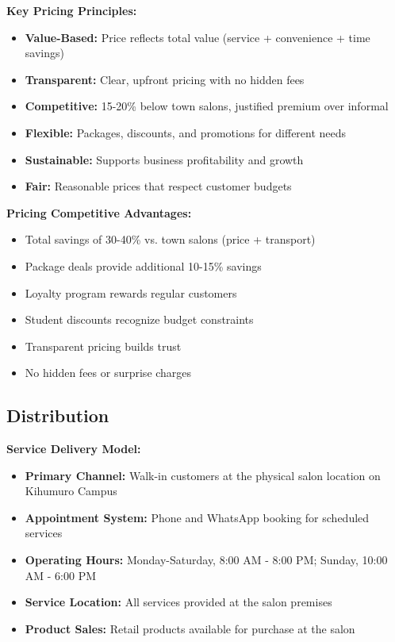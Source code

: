 \documentclass[a4paper,12pt]{article}
\begin{document}
\vspace{1em}

\begin{tcolorbox}[mybox, title=\textbf{Pricing Strategy Success Factors}]
\textbf{Key Pricing Principles:}
\begin{itemize}[leftmargin=1em, itemsep=0pt]
    \item \textbf{Value-Based:} Price reflects total value (service + convenience + time savings)
    \item \textbf{Transparent:} Clear, upfront pricing with no hidden fees
    \item \textbf{Competitive:} 15-20\% below town salons, justified premium over informal
    \item \textbf{Flexible:} Packages, discounts, and promotions for different needs
    \item \textbf{Sustainable:} Supports business profitability and growth
    \item \textbf{Fair:} Reasonable prices that respect customer budgets
\end{itemize}

\textbf{Pricing Competitive Advantages:}
\begin{itemize}[leftmargin=1em, itemsep=0pt]
    \item Total savings of 30-40\% vs. town salons (price + transport)
    \item Package deals provide additional 10-15\% savings
    \item Loyalty program rewards regular customers
    \item Student discounts recognize budget constraints
    \item Transparent pricing builds trust
    \item No hidden fees or surprise charges
\end{itemize}
\end{tcolorbox}

\subsection{Distribution}

\textbf{Service Delivery Model:}
\begin{itemize}[leftmargin=2em]
    \item \textbf{Primary Channel:} Walk-in customers at the physical salon location on Kihumuro Campus
    \item \textbf{Appointment System:} Phone and WhatsApp booking for scheduled services
    \item \textbf{Operating Hours:} Monday-Saturday, 8:00 AM - 8:00 PM; Sunday, 10:00 AM - 6:00 PM
    \item \textbf{Service Location:} All services provided at the salon premises
    \item \textbf{Product Sales:} Retail products available for purchase at the salon
\end{itemize}
\end{document}

